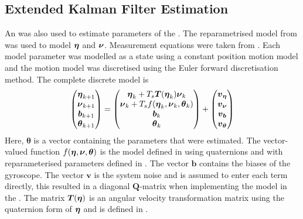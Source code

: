 \subsection{Extended Kalman Filter Estimation}
An \abbrEKF was also used to estimate parameters of the \abbrROV. The reparametrised model from  was used to model $\boldsymbol{\eta}$ and $\boldsymbol{\nu}$. Measurement equations were taken from . Each model parameter was modelled as a state using a constant position motion model and the motion model was discretised using the Euler forward discretisation method. The complete discrete model is
\begin{equation}
\label{eq:motionModelKalman}
\begin{pmatrix}
\boldsymbol{\eta}_{k+1}\\ 
\boldsymbol{\nu}_{k+1}\\
\boldsymbol{b}_{k+1}\\
\boldsymbol{\theta}_{k+1}
\end{pmatrix} = 
\begin{pmatrix}
\boldsymbol{\eta}_k + T_s \boldsymbol{T}(\boldsymbol{\eta}_k)\boldsymbol{\nu}_k\\
\boldsymbol{\nu}_k + T_s f(\boldsymbol{\eta}_k,\boldsymbol{\nu}_k,\boldsymbol{\theta}_k)\\
\boldsymbol{b}_k\\
\boldsymbol{\theta}_k
\end{pmatrix}
+ \begin{pmatrix}
\boldsymbol{v}_{\boldsymbol{\eta}}\\
\boldsymbol{v}_{\boldsymbol{\nu}}\\
\boldsymbol{v}_{\boldsymbol{b}}\\
\boldsymbol{v}_{\boldsymbol{\theta}}
\end{pmatrix}
\end{equation}
Here, $\boldsymbol{\theta}$ is a vector containing the parameters that were estimated. The vector-valued function $f(\boldsymbol{\eta},\boldsymbol{\nu},\boldsymbol{\theta})$ is the model defined in  using quaternions and with reparameterised parameters defined in . The vector $\boldsymbol{b}$  contains the biases of the gyroscope. The vector $\boldsymbol{v}$ is the system noise and is assumed to enter each term directly, this resulted in a diagonal $\boldsymbol{Q}$-matrix when implementing the model in the \abbrEKF. The matrix $\boldsymbol{T}(\boldsymbol{\eta})$ is an angular velocity transformation matrix using the quaternion form of $\boldsymbol{\eta}$ and is defined in .

